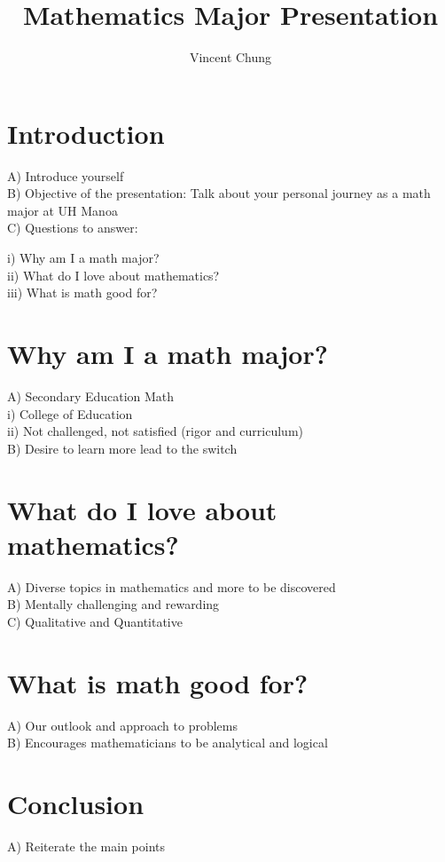 \documentclass[12pt]{article}
\begin{document}
\title{Mathematics Major Presentation}
\author{Vincent Chung}
\maketitle

\section{Introduction}
A) Introduce yourself\\
B) Objective of the presentation: Talk about your personal journey as a math major at UH Manoa\\
C) Questions to answer:
	
	i) Why am I a math major?\\
	
	ii) What do I love about mathematics?\\
	
	iii) What is math good for?\\
\section{Why am I a math major?}
A) Secondary Education Math\\

	i) College of Education\\
	
	ii) Not challenged, not satisfied (rigor and curriculum)\\
B) Desire to learn more lead to the switch

\section{What do I love about mathematics?}
A) Diverse topics in mathematics and more to be discovered\\
B) Mentally challenging and rewarding\\
C) Qualitative and Quantitative
\section{What is math good for?}
A) Our outlook and approach to problems\\ 
B) Encourages mathematicians to be analytical and logical\\
\section{Conclusion}
A) Reiterate the main points
\end{document}
